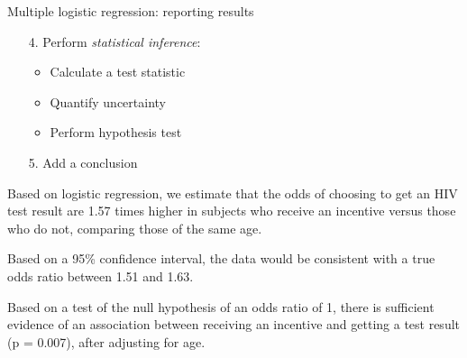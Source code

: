 \documentclass[10pt,t]{beamer}
\begin{document}
\begin{frame}{Multiple logistic regression: reporting results}
	\vspace{-5mm}
	
	\begin{enumerate}
		\item[4.] Perform \textit{statistical inference}:
		\begin{itemize}
			\item Calculate a test statistic
			\item Quantify uncertainty
			\item Perform hypothesis test
		\end{itemize}
		\item[5.] Add a conclusion
	\end{enumerate}

\medskip
	
	Based on logistic regression, we estimate that the odds of choosing to get an HIV test result are 1.57 times higher in subjects who receive an incentive versus those who do not, comparing those of the same age. 
	
	\medskip
	
	Based on a 95\% confidence interval, the data would be consistent with a true odds ratio between 1.51 and 1.63. 
	
	\medskip
	
	Based on a test of the null hypothesis of an odds ratio of 1, there is sufficient evidence of an association between receiving an incentive and getting a test result (p = 0.007), after adjusting for age. 
\end{frame}
\end{document}
